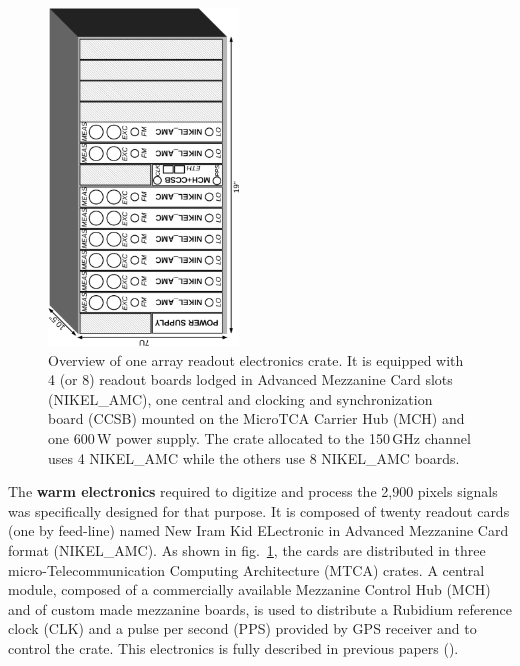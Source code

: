 \documentclass[]{aa} %
\begin{document}
\begin{figure}
\begin{center}
\includegraphics[angle=-90,width=0.45\textwidth]{NIKA_crate}
\caption{Overview of one array readout electronics crate.
It is equipped with 4 (or 8) readout boards lodged in Advanced Mezzanine Card slots (NIKEL\_AMC), one central and clocking and synchronization board (CCSB) mounted on the MicroTCA Carrier Hub (MCH) and one 600\,W power supply.
The crate allocated to the 150\,GHz channel uses 4 NIKEL\_AMC while the others use 8 NIKEL\_AMC boards.
\label{crateFig}}
\end{center}
\end{figure}

The \textbf{warm electronics} required to digitize and process the 2,900 pixels signals was specifically designed for that purpose.
It is composed of twenty readout cards (one by feed-line) named New Iram Kid ELectronic in Advanced Mezzanine Card format (NIKEL\_AMC).
As shown in fig.~\ref{crateFig}, the cards are distributed in three micro-Telecommunication Computing Architecture (MTCA) crates.
A central module, composed of a commercially available Mezzanine Control Hub (MCH) and of custom made mezzanine boards, is used to distribute a Rubidium reference clock (CLK) and a pulse per second (PPS) provided by GPS receiver and to control the crate.
This electronics is fully described in previous papers (\cite{Bourrion2012,Bourrion2016}).
\end{document}
